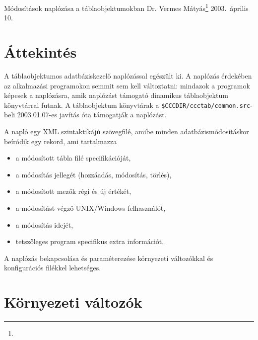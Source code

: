 
 
\pagetitle%
{Módosítások naplózása a táblaobjektumokban}%
{Dr. Vermes Mátyás\footnote{\ComFirm}}%
{2003.\ április 10.}

\section{Áttekintés}

A táblaobjektumos adatbáziskezelő naplózással egészült ki.
A naplózás érdekében az alkalmazási programokon semmit sem kell változtatni:
mindazok a programok képesek a naplózásra, amik  naplózást
 támogató dinamikus táblaobjektum könyvtárral futnak.
A táblaobjektum könyvtárak a \verb!$CCCDIR/ccctab/common.src!-beli  
2003.01.07-es javítás óta  támogatják a naplózást.

A napló egy XML szintaktikájú szövegfilé,
amibe minden adatbázismódosításkor beíródik egy rekord,
ami tartalmazza 
\begin{itemize}
\item
   a módosított tábla filé specifikációját,
\item
   a módosítás jellegét (hozzáadás, módosítás, törlés),
\item
   a módosított mezők régi és új értékét,
\item
   a módosítást végző UNIX/Windows felhasználót,
\item
   a módosítás idejét,
\item
   tetszőleges program specifikus extra információt.
\end{itemize}

A naplózás bekapcsolása és paraméterezése környezeti
változókkal és konfigurációs filékkel lehetséges.
 

\section{Környezeti változók}


